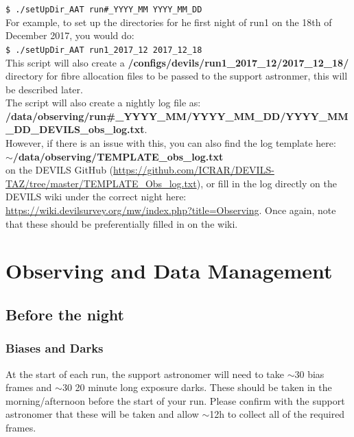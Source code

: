 \documentclass[12pt]{article}
\begin{document}
\hspace{10mm} \texttt{\$ ./setUpDir\_AAT run\#\_YYYY\_MM YYYY\_MM\_DD} \\

For example, to set up the directories for he first night of run1 on the 18th of December 2017, you would do: \\

\hspace{10mm} \texttt{\$ ./setUpDir\_AAT run1\_2017\_12 2017\_12\_18} \\
 
This script will also create a \textbf{/configs/devils/run1\_2017\_12/2017\_12\_18/} directory for fibre allocation files to be passed to the support astronmer, this will be described later. \\ 

The script will also create a nightly log file as: \\

\textbf{/data/observing/run\#\_YYYY\_MM/YYYY\_MM\_DD/YYYY\_MM\_DD\_DEVILS\_obs\_log.txt}. \\

However, if there is an issue with this, you can also find the log template here: \\

 \textbf{$\sim$/data/observing/TEMPLATE\_obs\_log.txt} \\
 
on the DEVILS GitHub (\url{https://github.com/ICRAR/DEVILS-TAZ/tree/master/TEMPLATE\_Obs\_log.txt}), or fill in the log directly on the DEVILS wiki under the correct night here: \url{https://wiki.devilsurvey.org/mw/index.php?title=Observing}. Once again, note that these should be preferentially filled in on the wiki.   


\section{Observing and Data Management}

\subsection{Before the night}

\subsubsection{Biases and Darks}

At the start of each run, the support astronomer will need to take $\sim30$ bias frames and $\sim30$ 20 minute long exposure darks.  These should be taken in the morning/afternoon before the start of your run. Please confirm with the support astronomer that these will be taken and allow $\sim$12h to collect all of the required frames.  
\end{document}
